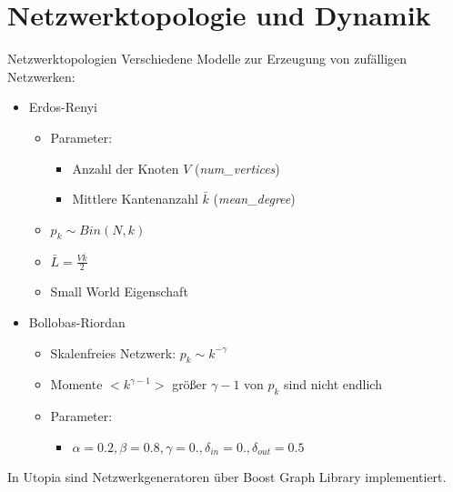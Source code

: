 \section{Netzwerktopologie und Dynamik}
\newcommand{\mdeg}{\bar{k}}
\newcommand{\vertices}{V}
\newcommand{\initrand}{\emph{init\_random\_weight}}
\newcommand{\infparamrand}{\emph{random\_infection\_parameters}}
\newcommand{\poprand}{\emph{random\_population}}
\newcommand{\medges}{\bar{L}}
\begin{frame}[t]{Netzwerktopologien} 
    Verschiedene Modelle zur Erzeugung von zufälligen Netzwerken:
    \begin{itemize}
        \item<1> Erdos-Renyi
            \begin{itemize}
            \item Parameter:
                \begin{itemize}
                    \item Anzahl der Knoten $\vertices$ (\emph{num\_vertices})
                    \item Mittlere Kantenanzahl $\mdeg$ (\emph{mean\_degree})
                \end{itemize}
            \item $p_k \sim Bin(N, k)$
            \item $\medges = \frac{\vertices \mdeg}{2}$
            \item Small World Eigenschaft
        \end{itemize}
        \item<2-> Bollobas-Riordan
            \begin{itemize}
                \item Skalenfreies Netzwerk: $p_k \sim k^{-\gamma}$
                \item Momente $<k^{\gamma -1}>$ größer $\gamma - 1$ von $p_k$ sind nicht endlich
                \item Parameter:
                    \begin{itemize}
                        \item $\alpha = 0.2, \beta=0.8, \gamma = 0., \delta_{in} = 0.,
                            \delta_{out} = 0.5$
                    \end{itemize}
            \end{itemize}
    \end{itemize}
    In Utopia sind Netzwerkgeneratoren über Boost Graph Library implementiert.
\end{frame}
